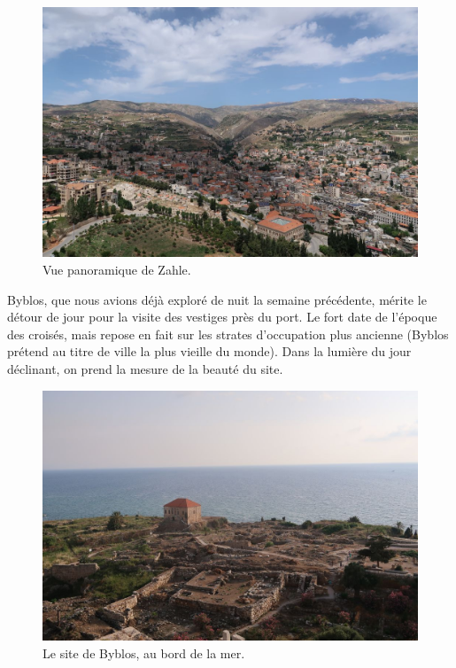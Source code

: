 \begin{figure}
\centering
\includegraphics{images/20180517_zahle.jpg}
\caption{Vue panoramique de Zahle.}
\end{figure}

Byblos, que nous avions déjà exploré de nuit la semaine précédente,
mérite le détour de jour pour la visite des vestiges près du port. Le
fort date de l'époque des croisés, mais repose en fait sur les strates
d'occupation plus ancienne (Byblos prétend au titre de ville la plus
vieille du monde). Dans la lumière du jour déclinant, on prend la mesure
de la beauté du site.

\begin{figure}
\centering
\includegraphics{images/20180517_byblos.jpg}
\caption{Le site de Byblos, au bord de la mer.}
\end{figure}

